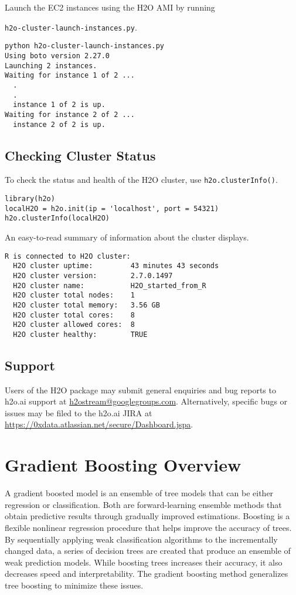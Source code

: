Launch the EC2 instances using the H2O AMI by running {\texttt{h2o-cluster-launch-instances.py}.

\begin{lstlisting}[style=R]
python h2o-cluster-launch-instances.py
Using boto version 2.27.0
Launching 2 instances.
Waiting for instance 1 of 2 ...
  .
  .
  instance 1 of 2 is up.
Waiting for instance 2 of 2 ...
  instance 2 of 2 is up.

\end{lstlisting}

\subsection{Checking Cluster Status}


To check the status and health of the H2O cluster, use {\texttt{h2o.clusterInfo()}}.
\begin{lstlisting}[style=R]
library(h2o)
localH2O = h2o.init(ip = 'localhost', port = 54321)
h2o.clusterInfo(localH2O)
\end{lstlisting}

An easy-to-read summary of information about the cluster displays. 
\begin{lstlisting}[style=R]
R is connected to H2O cluster:
  H2O cluster uptime:         43 minutes 43 seconds
  H2O cluster version:        2.7.0.1497
  H2O cluster name:           H2O_started_from_R
  H2O cluster total nodes:    1
  H2O cluster total memory:   3.56 GB
  H2O cluster total cores:    8
  H2O cluster allowed cores:  8
  H2O cluster healthy:        TRUE
\end{lstlisting}

\noindent

\subsection{Support} 
Users of the H2O package may submit general enquiries and bug reports to h2o.ai support at {\url{h2ostream@googlegroups.com}}. Alternatively, specific bugs or issues may be filed to the h2o.ai JIRA at {\url{https://0xdata.atlassian.net/secure/Dashboard.jspa}}.

\section{Gradient Boosting Overview} 

A gradient boosted model is an ensemble of tree models that can be either regression or classification. Both are forward-learning ensemble methods that obtain predictive results through gradually improved estimations. Boosting is a flexible nonlinear regression procedure that helps improve the accuracy of trees. By sequentially applying weak classification algorithms to the incrementally changed data, a series of decision trees are created that produce an ensemble of weak prediction models. While boosting trees increases their accuracy, it also decreases speed and interpretability. The gradient boosting method generalizes tree boosting to minimize these issues. 

}
